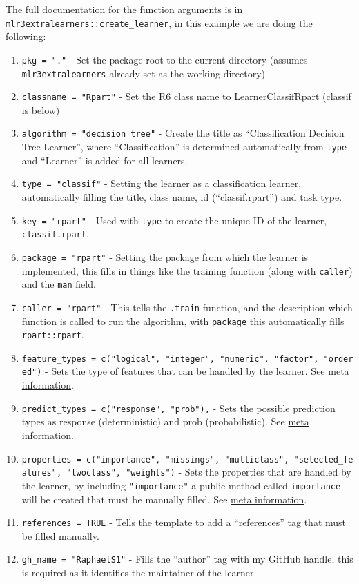 \documentclass[
]{scrbook}
\providecommand{\tightlist}{%
  \setlength{\itemsep}{0pt}\setlength{\parskip}{0pt}}
\begin{document}
The full documentation for the function arguments is in \href{https://mlr3extralearners.mlr-org.com/reference/create_learner.html}{\texttt{mlr3extralearners::create\_learner}}, in this example we are doing the following:

\begin{enumerate}
\def\labelenumi{\arabic{enumi}.}
\tightlist
\item
  \texttt{pkg\ =\ "."} - Set the package root to the current directory (assumes \texttt{mlr3extralearners} already set as the working directory)
\item
  \texttt{classname\ =\ "Rpart"} - Set the R6 class name to LearnerClassifRpart (classif is below)
\item
  \texttt{algorithm\ =\ "decision\ tree"} - Create the title as ``Classification Decision Tree Learner'', where ``Classification'' is determined automatically from \texttt{type} and ``Learner'' is added for all learners.
\item
  \texttt{type\ =\ "classif"} - Setting the learner as a classification learner, automatically filling the title, class name, id (``classif.rpart'') and task type.
\item
  \texttt{key\ =\ "rpart"} - Used with \texttt{type} to create the unique ID of the learner, \texttt{classif.rpart}.
\item
  \texttt{package\ =\ "rpart"} - Setting the package from which the learner is implemented, this fills in things like the training function (along with \texttt{caller}) and the \texttt{man} field.
\item
  \texttt{caller\ =\ "rpart"} - This tells the \texttt{.train} function, and the description which function is called to run the algorithm, with \texttt{package} this automatically fills \texttt{rpart::rpart}.
\item
  \texttt{feature\_types\ =\ c("logical",\ "integer",\ "numeric",\ "factor",\ "ordered")} - Sets the type of features that can be handled by the learner. See \protect\hyperlink{learner-meta-information}{meta information}.
\item
  \texttt{predict\_types\ =\ c("response",\ "prob"),} - Sets the possible prediction types as response (deterministic) and prob (probabilistic). See \protect\hyperlink{learner-meta-information}{meta information}.
\item
  \texttt{properties\ =\ c("importance",\ "missings",\ "multiclass",\ "selected\_features",\ "twoclass",\ "weights")} - Sets the properties that are handled by the learner, by including \texttt{"importance"} a public method called \texttt{importance} will be created that must be manually filled. See \protect\hyperlink{learner-meta-information}{meta information}.
\item
  \texttt{references\ =\ TRUE} - Tells the template to add a ``references'' tag that must be filled manually.
\item
  \texttt{gh\_name\ =\ "RaphaelS1"} - Fills the ``author'' tag with my GitHub handle, this is required as it identifies the maintainer of the learner.
\end{enumerate}
\end{document}
